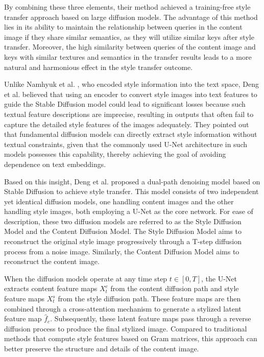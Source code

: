 By combining these three elements, their method achieved a training-free style transfer approach based on large diffusion models. The advantage of this method lies in its ability to maintain the relationship between queries in the content image if they share similar semantics, as they will utilize similar keys after style transfer. Moreover, the high similarity between queries of the content image and keys with similar textures and semantics in the transfer results leads to a more natural and harmonious effect in the style transfer outcome.

Unlike Namhyuk et al. \citep{63ahn2024dreamstyler}, who encoded style information into the text space, Deng et al.\citep{67deng2024z} believed that using an encoder to convert style images into text features to guide the Stable Diffusion model could lead to significant losses because such textual feature descriptions are imprecise, resulting in outputs that often fail to capture the detailed style features of the images adequately. They pointed out that fundamental diffusion models can directly extract style information without textual constraints, given that the commonly used U-Net architecture in such models possesses this capability, thereby achieving the goal of avoiding dependence on text embeddings.

Based on this insight, Deng et al. proposed a dual-path denoising model based on Stable Diffusion to achieve style transfer. This model consists of two independent yet identical diffusion models, one handling content images and the other handling style images, both employing a U-Net as the core network. For ease of description, these two diffusion models are referred to as the Style Diffusion Model and the Content Diffusion Model. The Style Diffusion Model aims to reconstruct the original style image progressively through a T-step diffusion process from a noise image. Similarly, the Content Diffusion Model aims to reconstruct the content image.

When the diffusion models operate at any time step $t \in [0, T]$, the U-Net extracts content feature maps $X^c_t$ from the content diffusion path and style feature maps $X^s_t$ from the style diffusion path. These feature maps are then combined through a cross-attention mechanism to generate a stylized latent feature map $\hat f_c$. Subsequently, these latent feature maps pass through a reverse diffusion process to produce the final stylized image. Compared to traditional methods that compute style features based on Gram matrices, this approach can better preserve the structure and details of the content image.


